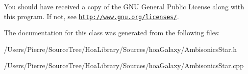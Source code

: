 You should have received a copy of the G\-N\-U General Public License along with this program. If not, see \href{http://www.gnu.org/licenses/}{\tt http\-://www.\-gnu.\-org/licenses/}. 

The documentation for this class was generated from the following files\-:\begin{DoxyCompactItemize}
\item 
/\-Users/\-Pierre/\-Source\-Tree/\-Hoa\-Library/\-Sources/hoa\-Galaxy/Ambisonics\-Star.\-h\item 
/\-Users/\-Pierre/\-Source\-Tree/\-Hoa\-Library/\-Sources/hoa\-Galaxy/Ambisonics\-Star.\-cpp\end{DoxyCompactItemize}
